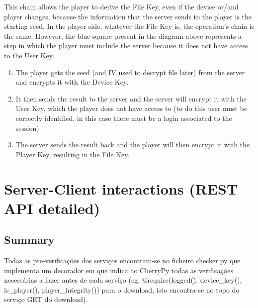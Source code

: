 \documentclass[11pt,a4paper]{report}
\begin{document}
This chain allows the player to derive the File Key, even if the device or/and player changes, because the information that the server sends to the player is the starting seed.
\newline In the player side, whatever the File Key is, the operation's chain is the same. However, the blue square present in the diagram above represents a step in which the player must include the server because it does not have access to the User Key.
\begin{enumerate}
  \item The player gets the seed (and IV used to decrypt file later) from the server and encrypts it with the Device Key.
  \item It then sends the result to the server and the server will encrypt it with the User Key, which the player does not have access to (to do this user must be correctly identified, in this case there must be a login associated to the session)
  \item The server sends the result back and the player will then encrypt it with the Player Key, resulting in the File Key.
\end{enumerate}

\chapter{Server-Client interactions (REST API detailed)}

\section{Summary}
Todas as pre-verificações dos serviços encontram-se no ficheiro checker.py que implementa um decorador em que indica ao CherryPy todas as verificações necessárias a fazer antes de cada serviço (eg. @require(logged(), device\_key(), is\_player(), player\_integrity()) para o download, isto encontra-se no topo do serviço GET do download).
\end{document}
